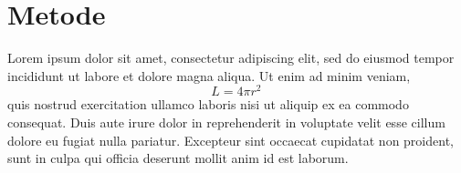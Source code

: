 \chapter{Metode}

Lorem ipsum dolor sit amet, consectetur adipiscing elit, sed do eiusmod tempor incididunt ut labore et dolore magna aliqua. Ut enim ad minim veniam, 
\begin{equation}
     L = 4 \pi r^2 \,
\end{equation}
quis nostrud exercitation ullamco laboris nisi ut aliquip ex ea commodo consequat. Duis aute irure dolor in reprehenderit in voluptate velit esse cillum dolore eu fugiat nulla pariatur. Excepteur sint occaecat cupidatat non proident, sunt in culpa qui officia deserunt mollit anim id est laborum.